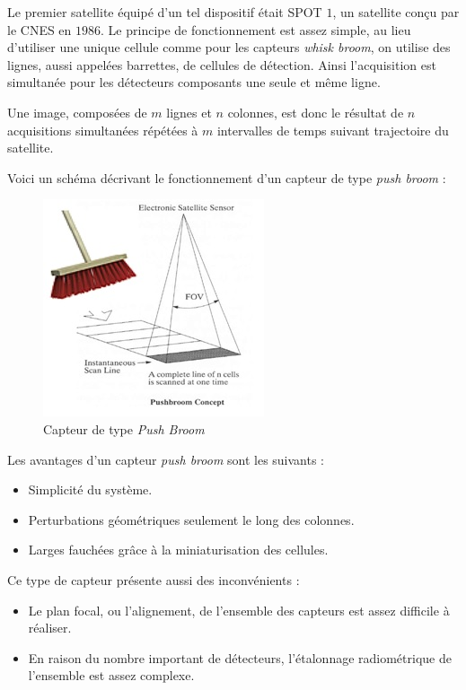 \documentclass[a4paper, 11pt]{report}
\begin{document}
Le premier satellite équipé d'un tel dispositif était SPOT $1$, un satellite conçu par le CNES en $1986$.
Le principe de fonctionnement est assez simple, au lieu d'utiliser une unique cellule comme pour les capteurs \emph{whisk broom}, on utilise des lignes, aussi appelées barrettes, de cellules de détection.
Ainsi l'acquisition est simultanée pour les détecteurs composants une seule et même ligne.

Une image, composées de $m$ lignes et $n$ colonnes, est donc le résultat de $n$ acquisitions simultanées répétées à $m$ intervalles de temps suivant trajectoire du satellite.

Voici un schéma décrivant le fonctionnement d'un capteur de type \emph{push broom} :
\begin{figure}[H]
	\begin{center}
		\includegraphics[scale=0.7]{Images/Push_Broom.jpg}
		\caption{Capteur de type \emph{Push Broom}}
	\end{center}
\end{figure}
Les avantages d'un capteur \emph{push broom} sont les suivants :
\begin{itemize}
	\item Simplicité du système.
	\item Perturbations géométriques seulement le long des colonnes.
	\item Larges fauchées grâce à la miniaturisation des cellules.
\end{itemize}
Ce type de capteur présente aussi des inconvénients :
\begin{itemize}
	\item Le plan focal, ou l'alignement, de l'ensemble des capteurs est assez difficile à réaliser.
	\item En raison du nombre important de détecteurs, l'étalonnage radiométrique de l'ensemble est assez complexe.
\end{itemize}
\end{document}

